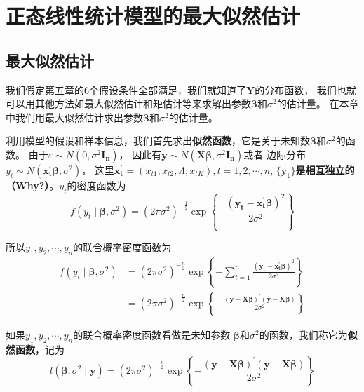 \chapter{正态线性统计模型的最大似然估计}

\section{最大似然估计}
	我们假定第五章的6个假设条件全部满足，我们就知道了$ \boldsymbol{Y} $的分布函数，
	我们也就可以用其他方法如最大似然估计和矩估计等来求解出参数$ \boldsymbol{ \beta } $和$ \sigma^{2} $的估计量。
	在本章中我们用最大似然估计求出参数$ \boldsymbol{ \beta } $和$ \sigma^{2} $的估计量。

	利用模型的假设和样本信息，我们首先求出\textbf{似然函数}，它是关于未知数$ \boldsymbol{\beta} $和$ \sigma^{2} $的函数。
	由于$ \varepsilon \sim N\left(0, \sigma^{2} \boldsymbol{I_{n}} \right) $，
	因此有$ \boldsymbol{y} \sim N \left(\boldsymbol{X \beta}, \sigma^{2} \boldsymbol{I_{n}}\right) $或者
	边际分布$ y_{t} \sim N\left( \boldsymbol{x_{t}^{\prime} \beta}, \sigma^{2}\right) $，
	这里$ \boldsymbol{x_{t}^{\prime}} = \left(x_{t 1}, x_{t 2}, \Lambda, x_{t K}\right), t=1,2, \cdots, n $,
    $ \bm{\{y_{t}\}}$\textbf{是相互独立的（Why?）}。$y_{t}$的密度函数为
	\[f \left(y_{t} \mid \boldsymbol{\beta}, \sigma^{2}\right)
			=\left(2 \pi \sigma^{2}\right)^{-\frac{1}{2}} \exp 
			\left\{-\frac{\left(\boldsymbol{y_{t}-x_{t}^{\prime} \beta}\right)^{2}}{2 \sigma^{2}}\right\}\]
	
    所以$ y_{1}, y_{2}, \cdots, y_{n} $的联合概率密度函数为
	\begin{equation}
		\begin{aligned}
			f\left(y_{t} \mid \boldsymbol{\beta}, \sigma^{2}\right)  
			& =  \left(2 \pi \sigma^{2}\right)^{-\frac{n}{2}} \exp \left\{-\sum_{t=1}^{n} 
				\frac{\left( \boldsymbol{y_{t}-x_{t}^{\prime} \beta}\right)^{2}}{2 \sigma^{2}}\right\} \\
			& =  \left(2 \pi \sigma^{2}\right)^{-\frac{n}{2}} \exp 
			\left \{-\frac{\boldsymbol{(y-X \beta)^{\prime}(y-X \beta)}}{2 \sigma^{2}}\right\} 
		\end{aligned}
	\end{equation}
	
   如果$ y_{1}, y_{2}, \cdots, y_{n} $的联合概率密度函数看做是未知参数
   	$ \boldsymbol{\beta} $和$ \sigma^{2} $的函数，我们称它为\textbf{似然函数}，记为   
	\[l\left(\boldsymbol{\beta}, \sigma^{2} \mid \boldsymbol{y} \right)=
		\left(2 \pi \sigma^{2}\right)^{-\frac{n}{2}} \exp 
		\left\{-\frac{\boldsymbol{(y-X \beta)^{\prime}(y-X \beta)}}{2 \sigma^{2}}\right\}\]
	
